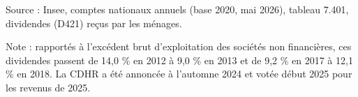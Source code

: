 Source : Insee, comptes nationaux annuels (base 2020, mai 2026), tableau 7.401, dividendes (D421) reçus par les ménages.\par Note : rapportés à l'excédent brut d'exploitation des sociétés non financières, ces dividendes passent de 14,0 \% en 2012 à 9,0 \% en 2013 et de 9,2 \% en 2017 à 12,1 \% en 2018. La CDHR a été annoncée à l'automne 2024 et votée début 2025 pour les revenus de 2025.
